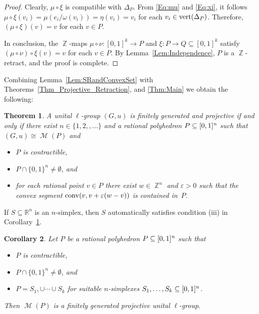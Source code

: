 \documentclass[reqno, draft]{amsart}
\newtheorem{theorem}{Theorem}[section]
\newtheorem{corollary}[theorem]{Corollary}
\theoremstyle{definition}
\begin{document}
\begin{proof}
Clearly, $\mu\circ\xi$ is compatible with $\Delta_P$.
From \eqref{Eq:mu} and \eqref{Eq:xi}, it follows
$\mu\circ\xi(v_i)=\mu(e_i/\omega(v_i))=\eta(v_i)=v_i$ 
for each  $v_i\in\operatorname{{\rm vert}}(\Delta_P)$. 
Therefore, $(\mu\circ\xi)(v)=v$ for each $v\in P$.

In conclusion,  the $\operatorname{\mathbb{Z}}$-maps $\mu\circ\nu\colon[0,1]^k\to P$ 
and $\xi\colon P\to Q\subseteq [0,1]^k$ 
satisfy $(\mu\circ\nu)\circ\xi(v)=v$ for each $v\in P$. 
By Lemma~\ref{Lem:Independence},
$P$ is a $\operatorname{\mathbb{Z}}$-retract, and the proof is complete.
\end{proof}

Combining  Lemma~\ref{Lem:SRandConvexSet} with
Theorems~\ref{Thm_Projective_Retraction}, and \ref{Thm:Main} 
we obtain the following:
\begin{theorem}\label{cor:last}
A unital $\ell$-group  $(G,u)$ is finitely generated and projective 
if and only if
there exist $n\in\{1,2,,\ldots\}$ and a rational  polyhedron
$P\subseteq {[0,1]^{\it n}}$ such that $(G,u)\cong\operatorname{\mathscr M}(P)$ and
\begin{itemize}
\item[(i)] $P$ is contractible,

\item[(ii)] $P\cap\{0,1\}^n\neq\emptyset$, and

\item[(iii)] 
for each rational point $v\in P$ 
 there exist $w\in \operatorname{\mathbb{Z}}^n$ and $\varepsilon>0$ such that the convex segment $\operatorname{{\rm conv}}(v,v+\varepsilon (w-v))$ is contained in~$P$.
\end{itemize}
\end{theorem}

If $S\subseteq {\mathbb{R}}^n$ is an $n$-simplex, 
then $S$ automatically satisfies condition (iii) in Corollary~\ref{cor:last}.

\begin{corollary}
Let $P$ be a rational  polyhedron $P\subseteq {[0,1]^{\it n}}$ such that 
\begin{itemize}
\item[(i)] $P$ is contractible,

\item[(ii)] $P\cap\{0,1\}^n\neq\emptyset$, and

\item[(iii)] $P=S_1,\cup\cdots\cup S_k$ for suitable $n$-simplexes $S_1,\ldots, S_k\subseteq {[0,1]^{\it n}}$.
\end{itemize}
Then $\operatorname{\mathscr M}(P)$ 
is a finitely generated projective unital $\ell$-group.
\end{corollary}
\end{document}
